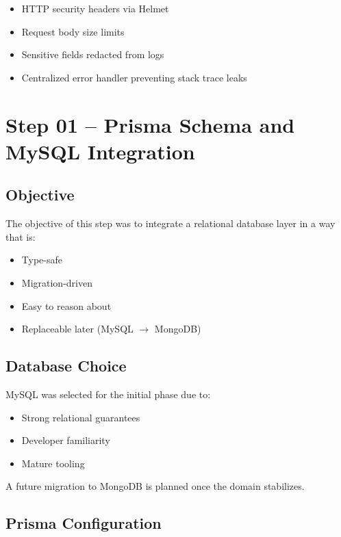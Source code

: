 \documentclass[11pt,a4paper]{article}
\begin{document}
    \begin{itemize}
        \item HTTP security headers via Helmet
        \item Request body size limits
        \item Sensitive fields redacted from logs
        \item Centralized error handler preventing stack trace leaks
    \end{itemize}

    \section{Step 01 -- Prisma Schema and MySQL Integration}

    \subsection{Objective}

    The objective of this step was to integrate a relational database layer
    in a way that is:
    \begin{itemize}
        \item Type-safe
        \item Migration-driven
        \item Easy to reason about
        \item Replaceable later (MySQL $\rightarrow$ MongoDB)
    \end{itemize}

    \subsection{Database Choice}

    MySQL was selected for the initial phase due to:
    \begin{itemize}
        \item Strong relational guarantees
        \item Developer familiarity
        \item Mature tooling
    \end{itemize}

    A future migration to MongoDB is planned once the domain stabilizes.

    \subsection{Prisma Configuration}
\end{document}
